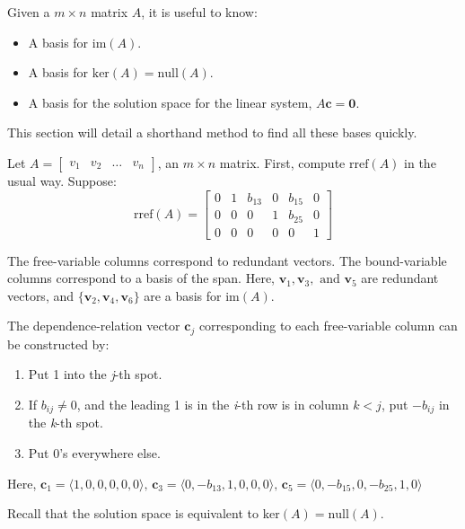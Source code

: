 \documentclass[../main.tex]{subfiles}
\begin{document}
Given a \( m \times n \) matrix \( A \),
it is useful to know:
\begin{itemize}
    \item A basis for \( \text{im}(A) \).
    \item A basis for \( \text{ker}(A) = \text{null}(A) \).
    \item A basis for the solution space for the linear system, \( A \textbf{c} = \textbf{0} \).
\end{itemize}
This section will detail a shorthand method to find all these bases quickly.

Let \( A = \begin{bmatrix}
    v_1 & v_2 & \dots & v_n
\end{bmatrix} \), an \( m \times n \) matrix.
First, compute \( \text{rref}(A) \) in the usual way. Suppose:
\[ \text{rref}(A) = \begin{bmatrix}
    0 & 1 & b_{13} & 0 & b_{15} & 0 \\
    0 & 0 & 0 & 1 & b_{25} & 0 \\
    0 & 0 & 0 & 0 & 0 & 1
\end{bmatrix} \]

The free-variable columns correspond to redundant vectors. The bound-variable columns correspond to a basis of the span.
Here, \( \textbf{v}_1, \textbf{v}_3, \text{ and } \textbf{v}_5 \) are redundant vectors,
and \( \{ \textbf{v}_2, \textbf{v}_4, \textbf{v}_6 \} \) are a basis for \( \text{im}(A) \).

The dependence-relation vector \( \textbf{c}_j \) corresponding to each free-variable column can be constructed by:
\begin{enumerate}
    \item Put 1 into the \textit{j}-th spot.
    \item If \( b_{ij} \neq 0 \), and the leading 1 is in the \textit{i}-th row is in column \( k < j \),
        put \( -b_{ij} \) in the \textit{k}-th spot.
    \item Put 0's everywhere else.
\end{enumerate}
Here, \( \textbf{c}_1 = \langle 1,0,0,0,0,0 \rangle, \,
    \textbf{c}_3 = \langle 0, -b_{13}, 1, 0, 0, 0 \rangle, \,
    \textbf{c}_5 = \langle 0, -b_{15}, 0, -b_{25}, 1, 0 \rangle \)

Recall that the solution space is equivalent to \( \text{ker}(A) = \text{null}(A) \).
\end{document}
